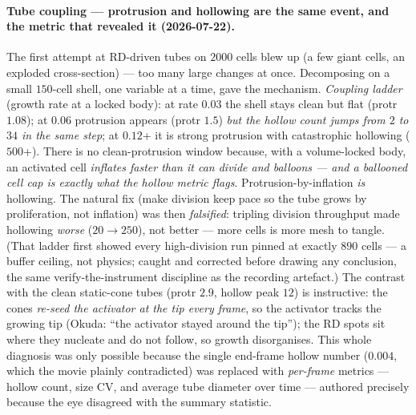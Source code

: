 \documentclass[11pt]{article}
\begin{document}
\paragraph{Tube coupling --- protrusion and hollowing are the same event, and the metric that revealed it
(2026-07-22).} The first attempt at RD-driven tubes on $2000$ cells blew up (a few giant cells, an
exploded cross-section) --- too many large changes at once. Decomposing on a small $150$-cell shell,
one variable at a time, gave the mechanism. \emph{Coupling ladder} (growth rate at a locked body): at
rate $0.03$ the shell stays clean but flat (protr $1.08$); at $0.06$ protrusion appears (protr $1.5$)
\emph{but the hollow count jumps from $2$ to $34$ in the same step}; at $0.12$+ it is strong protrusion
with catastrophic hollowing ($500$+). There is no clean-protrusion window because, with a volume-locked
body, an activated cell \emph{inflates faster than it can divide and balloons --- and a ballooned cell
cap is exactly what the hollow metric flags}. Protrusion-by-inflation \emph{is} hollowing. The natural
fix (make division keep pace so the tube grows by proliferation, not inflation) was then \emph{falsified}:
tripling division throughput made hollowing \emph{worse} ($20\!\to\!250$), not better --- more cells is
more mesh to tangle. (That ladder first showed every high-division run pinned at exactly $890$ cells --- a
buffer ceiling, not physics; caught and corrected before drawing any conclusion, the same
verify-the-instrument discipline as the recording artefact.) The contrast with the clean static-cone
tubes (protr $2.9$, hollow peak $12$) is instructive: the cones \emph{re-seed the activator at the tip
every frame}, so the activator tracks the growing tip (Okuda: ``the activator stayed around the tip'');
the RD spots sit where they nucleate and do not follow, so growth disorganises. This whole diagnosis was
only possible because the single end-frame hollow number ($0.004$, which the movie plainly contradicted)
was replaced with \emph{per-frame} metrics --- hollow count, size CV, and average tube diameter over time
--- authored precisely because the eye disagreed with the summary statistic.
\end{document}
